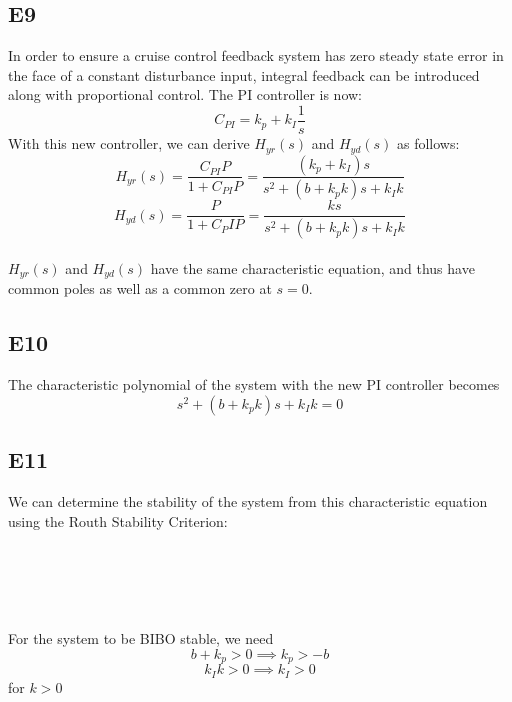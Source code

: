 \documentclass[11pt,titlepage]{article}
\begin{document}
	\subsection*{E9}
		In order to ensure a cruise control feedback system has zero steady state error in the face of a constant disturbance input, integral feedback can be introduced along with proportional control. The PI controller is now:
	\begin{equation}
		C_{PI}=k_p+k_I\frac{1}{s}
	\end{equation}
	With this new controller, we can derive $H_{yr}(s)$ and $H_{yd}(s)$ as follows:
	\begin{equation}
		H_{yr}(s)=\frac{C_{PI}P}{1+C_{PI}P}=\frac{(k_p+k_I)s}{s^2+(b+k_pk)s+k_Ik}
	\end{equation}	
	\begin{equation}
		H_{yd}(s)=\frac{P}{1+C_PIP}=\frac{ks}{s^2+(b+k_pk)s+k_Ik}
	\end{equation}\\
	$H_{yr}(s)$ and $H_{yd}(s)$ have the same characteristic equation, and thus have common poles as well as a common zero at $s=0$.
	
	\subsection*{E10}
	The characteristic polynomial of the system with the new PI controller becomes 
	\begin{equation}
		s^2+(b+k_pk)s+k_Ik=0
	\end{equation}
	
	\subsection*{E11}
		We can determine the stability of the system from this characteristic equation using the Routh Stability Criterion:\\\\
	\newcommand{\tab}[1]{\hspace{.2\textwidth}\rlap{#1}}
	\tab{$s^2$}  \tab{1} \tab{$k_Ik$}\\
	\tab{$s^1$} \tab{$b+k_p$} \tab{0}\\
	\tab{$s^0$} \tab{$k_Ik$} \tab{0}\\\\ 
	For the system to be BIBO stable, we need
	\begin{equation}
		b+k_p>0\implies k_p>-b
	\end{equation}
	\begin{equation}
		k_Ik>0\implies k_I>0
	\end{equation}
	for $k>0$
	
\end{document}
